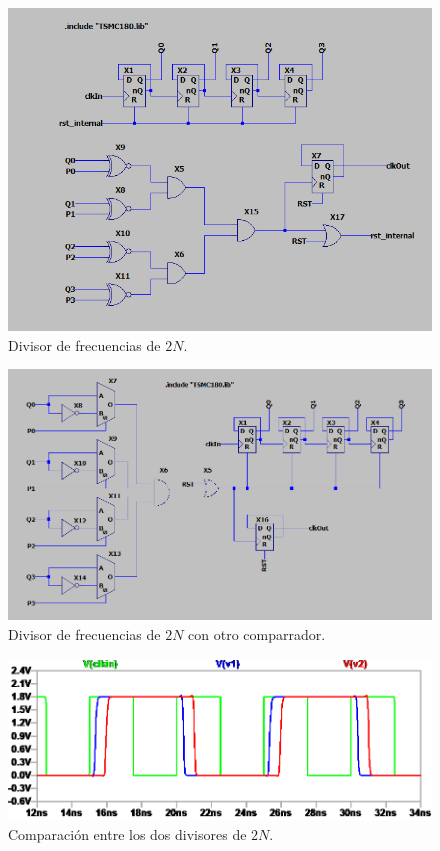 \documentclass[a4paper]{article}
\begin{document}
\begin{figure}[!htb]
\centering
\includegraphics[scale=0.4]{./img/freq_div_2n_sch}
\caption{Divisor de frecuencias de $2N$. }
\label{fig:freq_div_2n_sch}
\end{figure}

\begin{figure}[!htb]
\centering
\includegraphics[scale=0.4]{./img/freq_div_2n_v2_sch}
\caption{Divisor de frecuencias de $2N$ con otro comparrador. }
\label{fig:freq_div_2n_v2_sch}
\end{figure}

\begin{figure}[!htb]
\centering
\includegraphics[scale=0.4]{./img/freq_div_2n_test_v1_vs_v2_sim}
\caption{Comparación entre los dos divisores de $2N$. }
\label{fig:freq_div_2n_test_v1_vs_v2_sim}
\end{figure}
\end{document}
